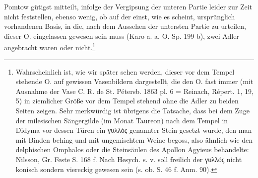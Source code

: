 \documentclass[a4paper, 11pt, oneside]{article}
\begin{document}
Pomtow gütigst mitteilt, infolge der Vergipsung der unteren Partie leider zur Zeit nicht feststellen, ebenso wenig, ob auf der einst, wie es scheint, ursprünglich vorhandenen Basis, in die, nach dem Aussehen der untersten Partie zu urteilen, dieser O. eingelassen gewesen sein muss (Karo a. a. O. Sp. 199 b), zwei Adler angebracht waren oder nicht.\footnote{Wahrscheinlich ist, wie wir später sehen werden, dieser vor dem Tempel stehende O. auf gewissen Vasenbildern dargestellt, die den O. fast immer (mit Ausnahme der Vase C. R. de St. Pétersb. 1863 pl. 6 = Reinach, Répert. 1, 19, 5) in ziemlicher Größe vor dem Tempel stehend ohne die Adler zu beiden Seiten zeigen. Sehr merkwürdig ist übrigens die Tatsache, dass bei dem Zuge der milesischen Sängergilde (im Monat Taureon) nach dem Tempel in Didyma vor dessen Türen ein γυλλός genannter Stein gesetzt wurde, den man mit Binden behing und mit ungemischtem Weine begoss, also ähnlich wie den delphischen Omphalos oder die Steinsäulen des Apollon Agyieus behandelte: Nilsson, Gr. Feste S. 168 f. Nach Hesych. s. v. soll freilich der γυλλός nicht konisch sondern viereckig gewesen sein (s. ob. S. 46 f. Anm. 90).}
\end{document}
